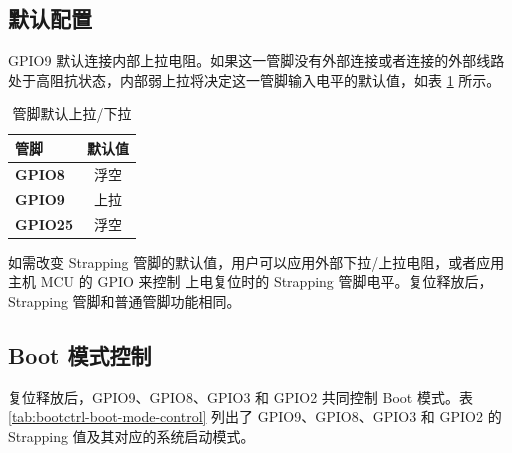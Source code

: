 \documentclass[main\_\_CN.tex]{subfiles}
\begin{document}
\subsection{默认配置}

GPIO9 默认连接内部上拉电阻。如果这一管脚没有外部连接或者连接的外部线路处于高阻抗状态，内部弱上拉将决定这一管脚输入电平的默认值，如表 \ref{tab:bootctrl-default-config-strapping-pins} 所示。

\clearpage
\begin{longtable}[c]{|p{1.5cm}|c|}
\caption{管脚默认上拉/下拉}
\label{tab:bootctrl-default-config-strapping-pins} \\
    \hline
    \rowcolor{lightgray}
  \textbf{管脚} & \textbf{默认值} \\ \hline
  \textbf{GPIO8} & 浮空 \\ \hline
  \textbf{GPIO9} & 上拉 \\ \hline
  \textbf{GPIO25} & 浮空 \\ \hline
\end{longtable}

如需改变 Strapping 管脚的默认值，用户可以应用外部下拉/上拉电阻，或者应用主机 MCU 的 GPIO 来控制 \chipname{} 上电复位时的 Strapping 管脚电平。复位释放后，Strapping 管脚和普通管脚功能相同。


\subsection{Boot 模式控制} \label{sec:bootModeControl}


复位释放后，GPIO9、GPIO8、GPIO3 和 GPIO2 共同控制 Boot 模式。表 \ref{tab:bootctrl-boot-mode-control} 列出了 GPIO9、GPIO8、GPIO3 和 GPIO2 的 Strapping 值及其对应的系统启动模式。
\end{document}
